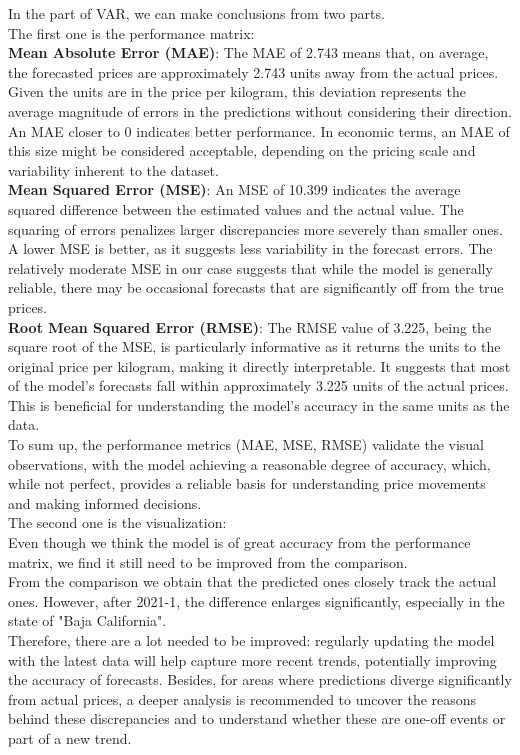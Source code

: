 \documentclass[12pt]{article}
\begin{document}
In the part of VAR, we can make conclusions from two parts.\\
The first one is the performance matrix:\\
\textbf{Mean Absolute Error (MAE)}: The MAE of 2.743 means that, on average, the forecasted prices are approximately 2.743 units away from the actual prices. Given the units are in the price per kilogram, this deviation represents the average magnitude of errors in the predictions without considering their direction. An MAE closer to 0 indicates better performance. In economic terms, an MAE of this size might be considered acceptable, depending on the pricing scale and variability inherent to the dataset.\\

\textbf{Mean Squared Error (MSE)}: An MSE of 10.399 indicates the average squared difference between the estimated values and the actual value. The squaring of errors penalizes larger discrepancies more severely than smaller ones. A lower MSE is better, as it suggests less variability in the forecast errors. The relatively moderate MSE in our case suggests that while the model is generally reliable, there may be occasional forecasts that are significantly off from the true prices.\\

\textbf{Root Mean Squared Error (RMSE)}: The RMSE value of 3.225, being the square root of the MSE, is particularly informative as it returns the units to the original price per kilogram, making it directly interpretable. It suggests that most of the model's forecasts fall within approximately 3.225 units of the actual prices. This is beneficial for understanding the model's accuracy in the same units as the data.\\

To sum up, the performance metrics (MAE, MSE, RMSE) validate the visual observations, with the model achieving a reasonable degree of accuracy, which, while not perfect, provides a reliable basis for understanding price movements and making informed decisions.\\

The second one is the visualization:\\
Even though we think the model is of great accuracy from the performance matrix, we find it still need to be improved from the comparison.\\
From the comparison we obtain that the predicted ones closely track the actual ones. However, after 2021-1, the difference enlarges significantly, especially in the state of "Baja California".\\
Therefore, there are a lot needed to be improved: regularly updating the model with the latest data will help capture more recent trends, potentially improving the accuracy of forecasts. Besides, for areas where predictions diverge significantly from actual prices, a deeper analysis is recommended to uncover the reasons behind these discrepancies and to understand whether these are one-off events or part of a new trend.


\end{document}

